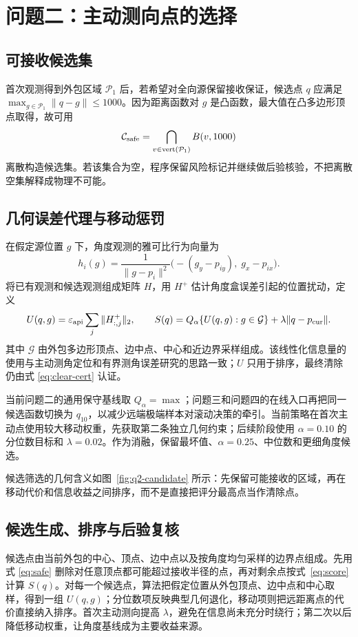 \section{问题二：主动测向点的选择}
\subsection{可接收候选集}
首次观测得到外包区域 $\mathcal P_1$ 后，若希望对全向源保留接收保证，候选点 $q$ 应满足 $\max_{g\in\mathcal P_1}\|q-g\|\le1000$。因为距离函数对 $g$ 是凸函数，最大值在凸多边形顶点取得，故可用
\begin{equation}\label{eq:safe}
\mathcal C_{\rm safe}=\bigcap_{v\in\operatorname{vert}(\mathcal P_1)}B(v,1000)
\end{equation}
离散构造候选集。若该集合为空，程序保留风险标记并继续做后验核验，不把离散空集解释成物理不可能。

\subsection{几何误差代理与移动惩罚}
在假定源位置 $g$ 下，角度观测的雅可比行为向量为
\begin{equation}
h_i(g)=\frac{1}{\|g-p_i\|^2}\bigl(-(g_y-p_{iy}),\;g_x-p_{ix}\bigr).
\end{equation}
将已有观测和候选观测组成矩阵 $H$，用 $H^+$ 估计角度盒误差引起的位置扰动，定义
\begin{equation}\label{eq:score}
U(q,g)=\varepsilon_{\rm api}\sum_j\|H^+_{:,j}\|_2,\qquad
S(q)=Q_{\alpha}\{U(q,g):g\in\mathcal G\}+\lambda\|q-p_{\rm cur}\|.
\end{equation}
其中 $\mathcal G$ 由外包多边形顶点、边中点、中心和近边界采样组成。该线性化信息量的使用与主动测角定位和有界测角误差研究的思路一致\cite{tokekar2012,tokekar2013,dogancay,cmu}；$U$ 只用于排序，最终清除仍由式 \eqref{eq:clear-cert} 认证。

当前问题二的通用保守基线取 $Q_\alpha=\max$；问题三和问题四的在线入口再把同一候选函数切换为 $q_{10}$，以减少远端极端样本对滚动决策的牵引。当前策略在首次主动点使用较大移动权重，先获取第二条独立几何约束；后续阶段使用 $\alpha=0.10$ 的分位数目标和 $\lambda=0.02$。作为消融，保留最坏值、$\alpha=0.25$、中位数和更细角度候选。

候选筛选的几何含义如图~\ref{fig:q2-candidate} 所示：先保留可能接收的区域，再在移动代价和信息收益之间排序，而不是直接把评分最高点当作清除点。

\subsection{候选生成、排序与后验复核}
候选点由当前外包的中心、顶点、边中点以及按角度均匀采样的边界点组成。先用式 \eqref{eq:safe} 删除对任意顶点都可能超过接收半径的点，再对剩余点按式~\eqref{eq:score} 计算 $S(q)$。对每一个候选点，算法把假定位置从外包顶点、边中点和中心取样，得到一组 $U(q,g)$；分位数项反映典型几何退化，移动项则把远距离点的代价直接纳入排序。首次主动测向提高 $\lambda$，避免在信息尚未充分时绕行；第二次以后降低移动权重，让角度基线成为主要收益来源。

